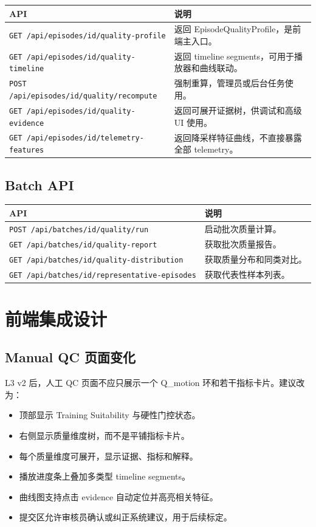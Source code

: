\documentclass[UTF8,zihao=-4,oneside,openany]{ctexrep}
\newcommand{\Code}[1]{\texttt{#1}}
\begin{document}
\begin{longtable}{L{5cm} L{8.5cm}}
\toprule
API & 说明 \\
\midrule
\Code{GET /api/episodes/{id}/quality-profile} & 返回 EpisodeQualityProfile，是前端主入口。 \\
\Code{GET /api/episodes/{id}/quality-timeline} & 返回 timeline segments，可用于播放器和曲线联动。 \\
\Code{POST /api/episodes/{id}/quality/recompute} & 强制重算，管理员或后台任务使用。 \\
\Code{GET /api/episodes/{id}/quality-evidence} & 返回可展开证据树，供调试和高级 UI 使用。 \\
\Code{GET /api/episodes/{id}/telemetry-features} & 返回降采样特征曲线，不直接暴露全部 telemetry。 \\
\bottomrule
\end{longtable}

\subsection{Batch API}

\begin{longtable}{L{5cm} L{8.5cm}}
\toprule
API & 说明 \\
\midrule
\Code{POST /api/batches/{id}/quality/run} & 启动批次质量计算。 \\
\Code{GET /api/batches/{id}/quality-report} & 获取批次质量报告。 \\
\Code{GET /api/batches/{id}/quality-distribution} & 获取质量分布和同类对比。 \\
\Code{GET /api/batches/{id}/representative-episodes} & 获取代表性样本列表。 \\
\bottomrule
\end{longtable}

\section{前端集成设计}

\subsection{Manual QC 页面变化}

L3 v2 后，人工 QC 页面不应只展示一个 Q\_motion 环和若干指标卡片。建议改为：

\begin{itemize}
\item 顶部显示 Training Suitability 与硬性门控状态。
\item 右侧显示质量维度树，而不是平铺指标卡片。
\item 每个质量维度可展开，显示证据、指标和解释。
\item 播放进度条上叠加多类型 timeline segments。
\item 曲线图支持点击 evidence 自动定位并高亮相关特征。
\item 提交区允许审核员确认或纠正系统建议，用于后续标定。
\end{itemize}
\end{document}
